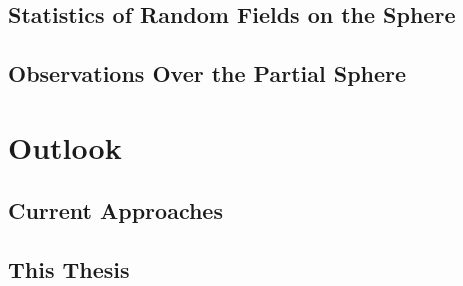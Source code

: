 

\subsection{Statistics of Random Fields on the Sphere}

\subsection{Observations Over the Partial Sphere}

\section{Outlook}\label{sec:chapter2_outlook}

\subsection{Current Approaches}

\subsection{This Thesis}
